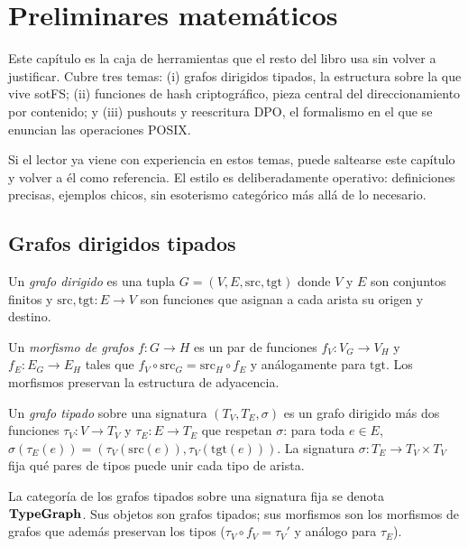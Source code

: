 \chapter{Preliminares matemáticos}
\label{cap:prelim}

Este capítulo es la caja de herramientas que el resto del libro usa sin
volver a justificar. Cubre tres temas: (i) grafos dirigidos tipados, la
estructura sobre la que vive sotFS; (ii) funciones de hash
criptográfico, pieza central del direccionamiento por contenido; y
(iii) pushouts y reescritura DPO, el formalismo en el que se enuncian
las operaciones POSIX.

Si el lector ya viene con experiencia en estos temas, puede saltearse
este capítulo y volver a él como referencia. El estilo es deliberadamente
operativo: definiciones precisas, ejemplos chicos, sin esoterismo
categórico más allá de lo necesario.

\section{Grafos dirigidos tipados}

\begin{defn}
\label{def:grafo-dirigido}
Un \emph{grafo dirigido} es una tupla $G = (V, E, \mathrm{src},
\mathrm{tgt})$ donde $V$ y $E$ son conjuntos finitos y
$\mathrm{src}, \mathrm{tgt}: E \to V$ son funciones que asignan a cada
arista su origen y destino.
\end{defn}

\begin{defn}
\label{def:morfismo-grafos}
Un \emph{morfismo de grafos} $f: G \to H$ es un par de funciones
$f_V: V_G \to V_H$ y $f_E: E_G \to E_H$ tales que $f_V \circ
\mathrm{src}_G = \mathrm{src}_H \circ f_E$ y análogamente para
$\mathrm{tgt}$. Los morfismos preservan la estructura de adyacencia.
\end{defn}

\begin{defn}
\label{def:grafo-tipado}
Un \emph{grafo tipado} sobre una signatura $(T_V, T_E, \sigma)$ es un
grafo dirigido más dos funciones $\tau_V: V \to T_V$ y $\tau_E: E \to
T_E$ que respetan $\sigma$: para toda $e \in E$, $\sigma(\tau_E(e)) =
(\tau_V(\mathrm{src}(e)), \tau_V(\mathrm{tgt}(e)))$. La signatura
$\sigma: T_E \to T_V \times T_V$ fija qué pares de tipos puede unir cada
tipo de arista.
\end{defn}

La categoría de los grafos tipados sobre una signatura fija se denota
$\mathbf{TypeGraph}$. Sus objetos son grafos tipados; sus morfismos son los
morfismos de grafos que además preservan los tipos
($\tau_V \circ f_V = \tau_V'$ y análogo para $\tau_E$).

